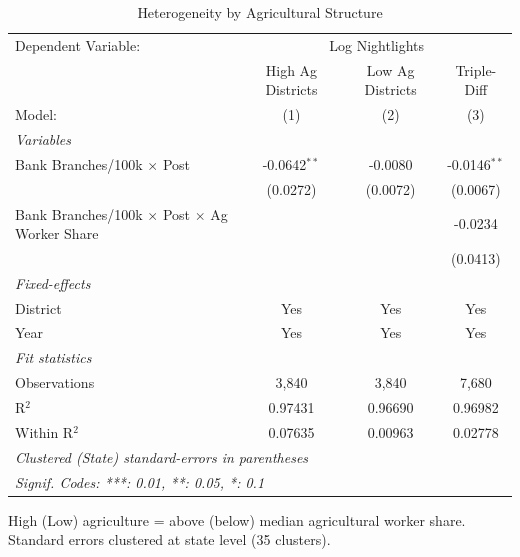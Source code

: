 
\begin{table}[htbp]
   \caption{\label{tab:heterogeneity} Heterogeneity by Agricultural Structure}
   \centering
   \begin{tabular}{lccc}
      \tabularnewline \midrule \midrule
      Dependent Variable: & \multicolumn{3}{c}{Log Nightlights}\\
                                                                  & High Ag Districts & Low Ag Districts & Triple-Diff \\   
      Model:                                                      & (1)               & (2)              & (3)\\  
      \midrule
      \emph{Variables}\\
      Bank Branches/100k $\times$ Post                            & -0.0642$^{**}$    & -0.0080          & -0.0146$^{**}$\\   
                                                                  & (0.0272)          & (0.0072)         & (0.0067)\\   
      Bank Branches/100k $\times$ Post $\times$ Ag Worker Share   &                   &                  & -0.0234\\   
                                                                  &                   &                  & (0.0413)\\   
      \midrule
      \emph{Fixed-effects}\\
      District                                                    & Yes               & Yes              & Yes\\  
      Year                                                        & Yes               & Yes              & Yes\\  
      \midrule
      \emph{Fit statistics}\\
      Observations                                                & 3,840             & 3,840            & 7,680\\  
      R$^2$                                                       & 0.97431           & 0.96690          & 0.96982\\  
      Within R$^2$                                                & 0.07635           & 0.00963          & 0.02778\\  
      \midrule \midrule
      \multicolumn{4}{l}{\emph{Clustered (State) standard-errors in parentheses}}\\
      \multicolumn{4}{l}{\emph{Signif. Codes: ***: 0.01, **: 0.05, *: 0.1}}\\
   \end{tabular}
   
   \par \raggedright 
   High (Low) agriculture = above (below) median agricultural worker share. Standard errors clustered at state level (35 clusters).
\end{table}


